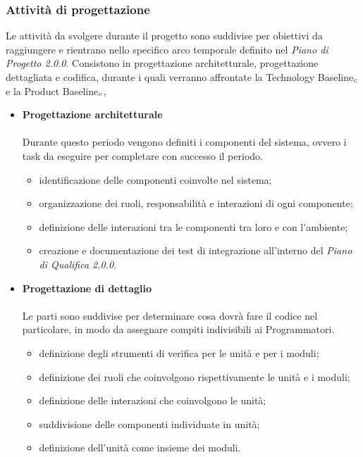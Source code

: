\subsubsection{Attività di progettazione}\label{ProcessiPrimariProgettazioneAttivita}
Le attività da svolgere durante il progetto sono suddivise per obiettivi da raggiungere e rientrano nello specifico arco temporale definito nel  \textit{Piano di Progetto 2.0.0}. Consistono in progettazione architetturale, progettazione dettagliata e codifica, durante i quali verranno affrontate la Technology Baseline$_{\scaleto{G}{3pt}}$ e la Product Baseline$_{\scaleto{G}{3pt}}$,
\begin{itemize}
	\item \textbf{Progettazione architetturale} \\ \\
	Durante questo periodo vengono definiti i componenti del sistema, ovvero i task da eseguire per completare con successo il periodo.
	\begin{itemize}
		\item identificazione delle componenti coinvolte nel sistema;
		\item organizzazione dei ruoli, responsabilità e interazioni di ogni componente;
		\item definizione delle interazioni tra le componenti tra loro e con l’ambiente;
		\item creazione e documentazione dei test di integrazione all’interno del \textit{Piano di Qualifica 2.0.0}.
	\end{itemize}
	\end{itemize}

\begin{itemize}
	\item \textbf{Progettazione di dettaglio} \\ \\
	Le parti sono suddivise per determinare cosa dovrà fare il codice nel particolare, in modo da assegnare compiti indivisibili ai Programmatori.
	\begin{itemize}
		\item definizione degli strumenti di verifica per le unità e per i moduli;
		\item definizione dei ruoli che coinvolgono rispettivamente le unità e i moduli;
		\item definizione delle interazioni che coinvolgono le unità;
		\item suddivisione delle componenti individuate in unità;
		\item definizione dell'unità come insieme dei moduli.
	\end{itemize}
\end{itemize}
